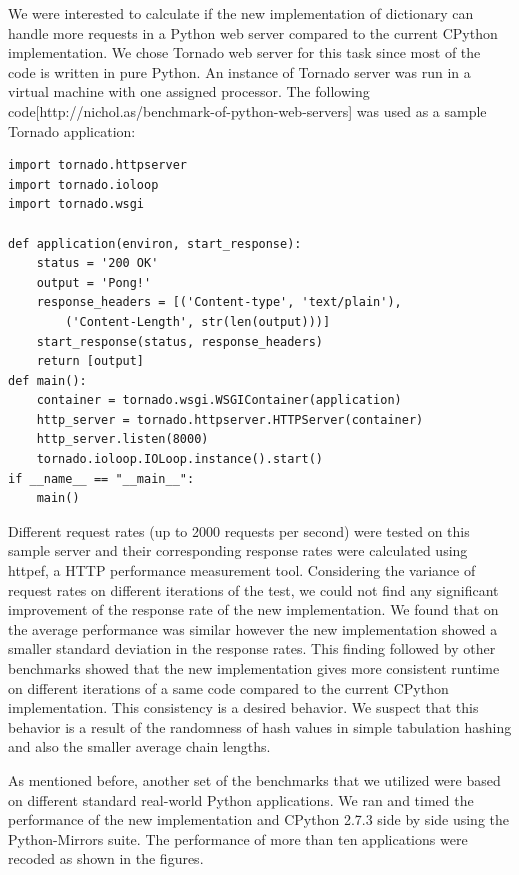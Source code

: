 \documentclass[11pt]{article}
\begin{document}
We were interested to calculate if the new implementation of dictionary can handle more requests in a Python web server compared to the current CPython implementation. We chose Tornado web server for this task since most of the code is written in pure Python. An instance of Tornado server was run in a virtual machine with one assigned processor. The following code[http://nichol.as/benchmark-of-python-web-servers] was used as a sample Tornado application:
 \begin{verbatim}
import tornado.httpserver
import tornado.ioloop
import tornado.wsgi

def application(environ, start_response):
    status = '200 OK'
    output = 'Pong!' 
    response_headers = [('Content-type', 'text/plain'),
        ('Content-Length', str(len(output)))]
    start_response(status, response_headers)
    return [output]
def main():
    container = tornado.wsgi.WSGIContainer(application)
    http_server = tornado.httpserver.HTTPServer(container)
    http_server.listen(8000)
    tornado.ioloop.IOLoop.instance().start()
if __name__ == "__main__":
    main()
 \end{verbatim}

Different request rates (up to 2000 requests per second) were tested on this sample server and their corresponding response rates were calculated using httpef, a HTTP performance measurement tool. Considering the variance of request rates on different iterations of the test, we could not find any significant improvement of the response rate of the new implementation. We found that on the average performance was similar however the new implementation showed a smaller standard deviation in the response rates. This finding followed by other benchmarks showed that the new implementation gives more consistent runtime on different iterations of a same code compared to the current CPython implementation. This consistency is a desired behavior. We suspect that this behavior is a result of the randomness of hash values in simple tabulation hashing and also the smaller average chain lengths.

As mentioned before, another set of the benchmarks that we utilized were based on different standard real-world Python applications. We ran and timed the performance of the new implementation and CPython 2.7.3 side by side using the Python-Mirrors suite. The performance of more than ten applications were recoded as shown in the figures.
\end{document}
